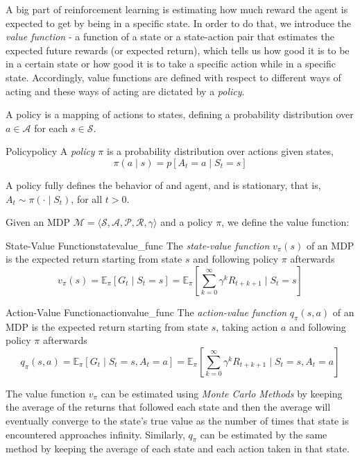 A big part of reinforcement learning is estimating how much reward the agent is expected to get by being in a specific state. In order to do that, we introduce the \textit{value function} - a function of a state or a state-action pair that estimates the expected future rewards (or expected return), which tells us how good it is to be in a certain state or how good it is to take a specific action while in a specific state. Accordingly, value functions are defined with respect to different ways of acting and these ways of acting are dictated by a \textit{policy}. 

A policy is a mapping of actions to states, defining a probability distribution over $a \in \mathcal{A}$ for each $s \in \mathcal{S}$.
\begin{definition}{Policy}{policy}
      A \textit{policy} $\pi$ is a probability distribution over actions given states,
      \begin{equation}\label{eq:policy_def}
            \pi(a \mid s) = p[A_t = a \mid  S_t = s]
      \end{equation}  
\end{definition}
A policy fully defines the behavior of and agent, and is stationary, that is, $A_t \sim \pi(\cdot \mid S_t)$, for all $t > 0$.

Given an MDP $\mathcal{M} = \langle \mathcal{S}, \mathcal{A}, \mathcal{P}, \mathcal{R}, \gamma \rangle$ and a policy $\pi$, we define the value function:
\begin{definition}{State-Value Function}{statevalue_func}
      The \textit{state-value function} $v_\pi(s)$ of an MDP is the expected return starting from state $s$ and following policy $\pi$ afterwards
      \begin{equation}\label{eq:statevalue_func_def}
            v_\pi(s) = \mathbb{E}_\pi[G_t \mid S_t = s] = \mathbb{E}_\pi\left[\sum^{\infty}_{k=0}\gamma^kR_{t+k+1} \mid S_t = s\right]
      \end{equation}  
\end{definition}

\begin{definition}{Action-Value Function}{actionvalue_func}
      The \textit{action-value function} $q_\pi(s, a)$ of an MDP is the expected return starting from state $s$, taking action $a$ and following policy $\pi$ afterwards
      \begin{equation}\label{eq:actionvalue_func_def}
            q_\pi(s, a) = \mathbb{E}_\pi[G_t \mid S_t = s, A_t = a] = \mathbb{E}_\pi\left[\sum^{\infty}_{k=0}\gamma^kR_{t+k+1}\mid S_t = s, A_t = a\right]
      \end{equation}  
\end{definition}
The value function $v_\pi$ can be estimated using \textit{Monte Carlo Methods} by keeping the average of the returns that followed each state and then the average will eventually converge to the state's true value as the number of times that state is encountered approaches infinity. Similarly, $q_\pi$ can be estimated by the same method by keeping the average of each state and each action taken in that state.

